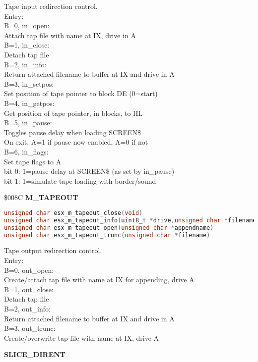 Tape input redirection control.\\
Entry:\\
B=0, in\_open:\\
Attach tap file with name at IX, drive in A\\
B=1, in\_close:\\
Detach tap file\\
B=2, in\_info:\\
Return attached filename to buffer at IX and drive in A\\
B=3, in\_setpos:\\
Set position of tape pointer to block DE (0=start)\\
B=4, in\_getpos:\\
Get position of tape pointer, in blocks, to HL\\
B=5, in\_pause:\\
Toggles pause delay when loading SCREEN\$\\
On exit, A=1 if pause now enabled, A=0 if not\\
B=6, in\_flags:\\
Set tape flags to A\\
bit 0: 1=pause delay at SCREEN\$ (as set by in\_pause)\\
bit 1: 1=simulate tape loading with border/sound

\$008C \textbf{M\_TAPEOUT}

\begin{lstlisting}[language=C]
unsigned char esx_m_tapeout_close(void)
unsigned char esx_m_tapeout_info(uint8_t *drive,unsigned char *filename)
unsigned char esx_m_tapeout_open(unsigned char *appendname)
unsigned char esx_m_tapeout_trunc(unsigned char *filename)
\end{lstlisting}

Tape output redirection control.\\
Entry:\\
B=0, out\_open:\\
Create/attach tap file with name at IX for appending, drive A\\
B=1, out\_close:\\
Detach tap file\\
B=2, out\_info:\\
Return attached filename to buffer at IX and drive in A\\
B=3, out\_trunc:\\
Create/overwrite tap file with name at IX, drive A

\textbf{SLICE\_DIRENT}

